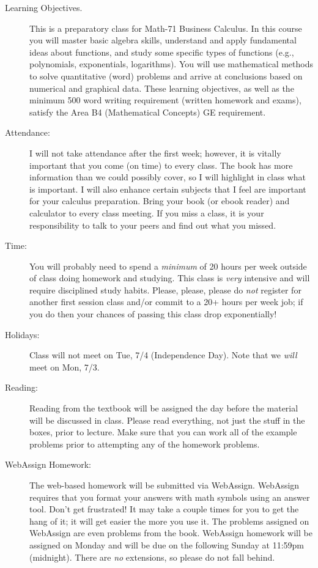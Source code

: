 \documentclass[letterpaper,12pt,fleqn]{article}
\begin{document}
\begin{description}
\item[Learning Objectives.] This is a preparatory class for Math-71 Business Calculus. In
  this course you will master basic algebra skills, understand and apply fundamental
  ideas about functions, and study some specific types of functions (e.g., polynomials,
  exponentials, logarithms). You will use mathematical methods to solve quantitative
  (word) problems and arrive at conclusions based on numerical and graphical data.  These
  learning objectives, as well as the minimum 500 word writing requirement (written
  homework and exams), satisfy the Area B4 (Mathematical Concepts) GE requirement.
\newpage
\item[Attendance:] I will not take attendance after the first week; however, it
  is vitally important that you come (on time) to every class. The book has
  more information than we could possibly cover, so I will highlight in class
  what is important. I will also enhance certain subjects that I feel are
  important for your calculus preparation. Bring your book (or ebook reader) and
  calculator to every class meeting. If you miss a class, it is your responsibility to
  talk to your peers and find out what you missed.

\item[Time:] You will probably need to spend a \emph{minimum} of 20 hours per
  week outside of class doing homework and studying. This class is \emph{very}
  intensive and will require disciplined study habits. Please, please, please
  do \emph{not} register for another first session class and/or commit to a 20+ hours
  per week job; if you do then your chances of passing this class drop exponentially!

\item[Holidays:] Class will not meet on Tue, 7/4 (Independence Day). Note that we
  \emph{will} meet on Mon, 7/3.

\item[Reading:] Reading from the textbook will be assigned the day before the material
  will be discussed in class. Please read everything, not just the stuff in the boxes,
  prior to lecture. Make sure that you can work all of the example problems prior to
  attempting any of the homework problems.

\item[WebAssign Homework:] The web-based homework will be submitted via WebAssign.
  Web\-Assign requires that you format your answers with math symbols using an answer
  tool. Don't get frustrated! It may take a couple times for you to get the hang of it;
  it will get easier the more you use it. The problems assigned on WebAssign are even
  problems from the book. WebAssign homework will be assigned on Monday and will be due
  on the following Sunday at 11:59pm (midnight). There are \emph{no} extensions, so
  please do not fall behind.


\end{description}
\end{document}
